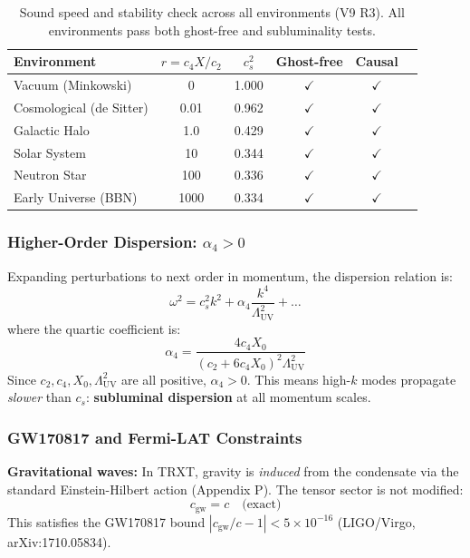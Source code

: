 \documentclass[a4paper,12pt]{article}
\begin{document}
\begin{table}[H]
\centering
\caption{Sound speed and stability check across all environments (V9 R3). All environments pass both ghost-free and subluminality tests.}
\label{tab:lorentz_v9}
\begin{tabular}{@{}lccccc@{}}
\toprule
\textbf{Environment} & $r = c_4 X/c_2$ & $c_s^2$ & \textbf{Ghost-free} & \textbf{Causal} \\
\midrule
Vacuum (Minkowski) & 0 & 1.000 & $\checkmark$ & $\checkmark$ \\
Cosmological (de Sitter) & 0.01 & 0.962 & $\checkmark$ & $\checkmark$ \\
Galactic Halo & 1.0 & 0.429 & $\checkmark$ & $\checkmark$ \\
Solar System & 10 & 0.344 & $\checkmark$ & $\checkmark$ \\
Neutron Star & 100 & 0.336 & $\checkmark$ & $\checkmark$ \\
Early Universe (BBN) & 1000 & 0.334 & $\checkmark$ & $\checkmark$ \\
\bottomrule
\end{tabular}
\end{table}

\subsubsection{Higher-Order Dispersion: $\alpha_4 > 0$}
Expanding perturbations to next order in momentum, the dispersion relation is:
\begin{equation}
    \omega^2 = c_s^2 k^2 + \alpha_4 \frac{k^4}{\Lambda_{\mathrm{UV}}^2} + \ldots
\end{equation}
where the quartic coefficient is:
\begin{equation}
    \alpha_4 = \frac{4c_4 X_0}{(c_2 + 6c_4 X_0)^2 \Lambda_{\mathrm{UV}}^2}
\end{equation}
Since $c_2, c_4, X_0, \Lambda_{\mathrm{UV}}^2$ are all positive, $\alpha_4 > 0$. This means high-$k$ modes propagate \emph{slower} than $c_s$: \textbf{subluminal dispersion} at all momentum scales.

\subsubsection{GW170817 and Fermi-LAT Constraints}
\textbf{Gravitational waves:} In TRXT, gravity is \emph{induced} from the condensate via the standard Einstein-Hilbert action (Appendix P). The tensor sector is not modified:
\begin{equation}
    c_{\mathrm{gw}} = c \quad \text{(exact)}
\end{equation}
This satisfies the GW170817 bound $|c_{\mathrm{gw}}/c - 1| < 5 \times 10^{-16}$ (LIGO/Virgo, arXiv:1710.05834).
\end{document}
